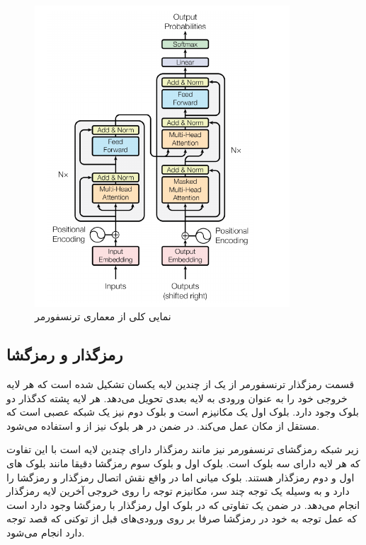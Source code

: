 \begin{figure}[h]
	\centering
	\includegraphics[width=0.85\textwidth]{images/chap3/transformer_arch.png}
	\caption{
		نمایی کلی از معماری ترنسفورمر
		\cite{transformer}
	}
	\label{fig:chap3:transfoermer_overview}
\end{figure}

\subsection{رمزگذار و رمزگشا}
قسمت رمزگذار ترنسفورمر از یک 
از چندین لایه یکسان تشکیل شده است که هر لایه خروجی خود را به عنوان ورودی به لایه بعدی تحویل می‌دهد. هر لایه پشته کدگذار دو بلوک وجود دارد. بلوک اول یک مکانیزم 
است و بلوک دوم نیز یک شبکه عصبی 
است که مستقل از مکان عمل می‌کند. در ضمن در هر بلوک نیز از 
و 
استفاده می‌شود.

زیر شبکه رمزگشای ترنسفورمر نیز مانند رمزگذار دارای چندین لایه است با این تفاوت که هر لایه دارای سه بلوک است. بلوک اول و بلوک سوم رمزگشا دقیقا مانند بلوک های اول و دوم رمزگذار هستند. بلوک میانی اما در واقع نقش اتصال رمزگذار و رمزگشا را دارد و به وسیله یک توجه چند سر، مکانیزم توجه را روی خروجی آخرین لایه رمزگذار انجام می‌دهد. در ضمن یک تفاوتی که در بلوک اول رمزگذار با رمزگشا وجود دارد است که عمل توجه به خود در رمزگشا صرفا بر روی ورودی‌های قبل از توکنی که قصد توجه دارد انجام می‌شود.


